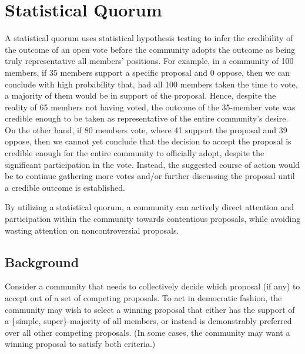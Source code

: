 \documentclass[chi_draft]{sigchi}
\begin{document}


\section{Statistical Quorum}
\label{sec:statistical-quorum}
A statistical quorum uses statistical hypothesis testing to infer the credibility of the outcome of an open vote before the community adopts the outcome as being truly representative all members' positions.
For example, in a community of 100 members, if 35 members support a specific proposal and 0 oppose, then we can conclude with high probability that, had all 100 members taken the time to vote, a majority of them would be in support of the proposal.  Hence, despite the reality of 65 members not having voted, the outcome of the 35-member vote was credible enough to be taken as representative of the entire community's desire.
On the other hand, if 80 members vote, where 41 support the proposal and 39 oppose, then we cannot yet conclude that the decision to accept the proposal is credible enough for the entire community to officially adopt, despite the significant participation in the vote.
Instead, the suggested course of action would be to continue gathering more votes and/or further discussing the proposal until a credible outcome is established.

By utilizing a statistical quorum, a community can actively direct attention and participation within the community towards contentious proposals, while avoiding wasting attention on noncontroversial proposals.

\subsection{Background}
Consider a community that needs to collectively decide which proposal (if any) to accept out of a set of competing proposals.
To act in democratic fashion, the community may wish to select a winning proposal that either has the support of a \{simple, super\}-majority of all members, or instead is demonstrably preferred over all other competing proposals.  (In some cases, the community may want a winning proposal to satisfy both criteria.)
\end{document}
